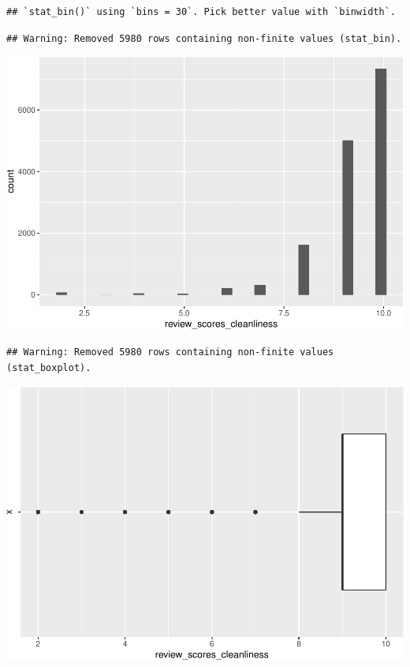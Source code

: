 \begin{verbatim}
## `stat_bin()` using `bins = 30`. Pick better value with `binwidth`.
\end{verbatim}

\begin{verbatim}
## Warning: Removed 5980 rows containing non-finite values (stat_bin).
\end{verbatim}

\includegraphics{anal_files/figure-latex/unnamed-chunk-9-46.pdf}

\begin{verbatim}
## Warning: Removed 5980 rows containing non-finite values (stat_boxplot).
\end{verbatim}

\includegraphics{anal_files/figure-latex/unnamed-chunk-9-47.pdf}

